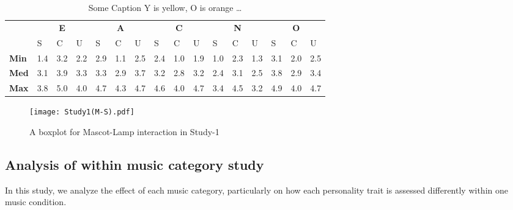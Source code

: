 \begin{table}[H]
    \renewcommand{\arraystretch}{1.2}
    \caption{Some Caption Y is yellow, O is orange \ldots}
    \label{table:medianMS1}
    \begin{center}
        \begin{tabular}{p{}|
        p{}|p{}|p{}||
        p{}|p{}|p{}||
        p{}|p{}|p{}||
        p{}|p{}|p{}||
        p{}|p{}|p{}|}
            \cline{2-16}
            & \multicolumn{3}{c||}{\textbf{E}} & \multicolumn{3}{c||}{\textbf{A}}
            & \multicolumn{3}{c||}{\textbf{C}} &  \multicolumn{3}{c||}{\textbf{N}} & \multicolumn{3}{c|}{\textbf{O}} \\
            \cline{2-16}
                            & S & C & U  			& S & C & U   	 	& S & C & U      & S & C & U  		& S & C & U     		\\
            \cline{2-16}
            \textbf{Min}  	& 1.4 & 3.2 & 2.2  		& 2.9 & 1.1 & 2.5   	& 2.4 & 1.0 & 1.9   & 1.0 & 2.3 & 1.3 	& 3.1 & 2.0 & 2.5 \\
            \textbf{Med} 	& 3.1 & 3.9 & 3.3  		& 3.3 & 2.9 & 3.7  	    & 3.2 & 2.8 & 3.2   & 2.4 & 3.1 & 2.5 	& 3.8 & 2.9 & 3.4\\
            \textbf{Max}	& 3.8 & 5.0 & 4.0  		& 4.7 & 4.3 & 4.7   	& 4.6 & 4.0 & 4.7   & 3.4 & 4.5 & 3.2 	& 4.9 & 4.0 & 4.7\\
            \cline{2-16}
        \end{tabular}
    \end{center}
\end{table}

\begin{figure}[H]
    \centering
    \texttt{[image: Study1(M-S).pdf]}
    \caption{A boxplot for Mascot-Lamp interaction in Study-1}
    \label{fig:MS1}
\end{figure}

\subsection{Analysis of within music category study}
\label{subsec:MSstudy2}
In this study, we analyze the effect of each music category, particularly on how each personality
trait is assessed differently within one music condition.


